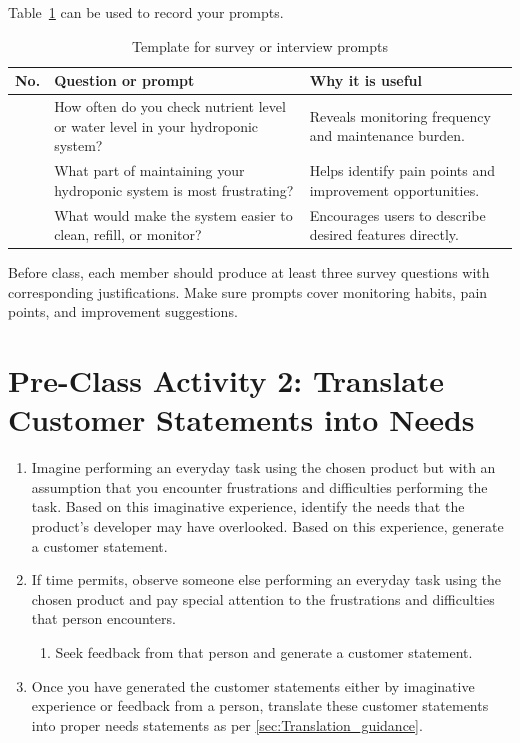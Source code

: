 Table~\ref{tab:session7-question-template} can be used to record your prompts.

\begin{table}[htbp]
\centering
\caption{Template for survey or interview prompts}
\label{tab:session7-question-template}
\renewcommand{\arraystretch}{1.2}
\begin{tabularx}{\textwidth}{|>{\raggedright\arraybackslash}p{}|>{\raggedright\arraybackslash}X|>{\raggedright\arraybackslash}p{}|}
\hline
\textbf{No.} & \textbf{Question or prompt} & \textbf{Why it is useful} \\
\hline
1 & How often do you check nutrient level or water level in your hydroponic system? & Reveals monitoring frequency and maintenance burden. \\
\hline
2 & What part of maintaining your hydroponic system is most frustrating? & Helps identify pain points and improvement opportunities. \\
\hline
3 & What would make the system easier to clean, refill, or monitor? & Encourages users to describe desired features directly. \\
\hline
\end{tabularx}
\end{table}

\begin{tcolorbox}[title=Checkpoint]
Before class, each member should produce at least three survey questions with corresponding justifications. Make sure prompts cover monitoring habits, pain points, and improvement suggestions.
\end{tcolorbox}

\section{Pre-Class Activity 2: Translate Customer Statements into Needs}

\begin{enumerate}
    \item Imagine performing an everyday task using the chosen product but with an assumption that you encounter frustrations and difficulties performing the task. Based on this imaginative experience, identify the needs that the product's developer may have overlooked. Based on this experience, generate a customer statement.
    \item If time permits, observe someone else performing an everyday task using the chosen product and pay special attention to the frustrations and difficulties that person encounters.
    \begin{enumerate}
        \item Seek feedback from that person and generate a customer statement.
    \end{enumerate}
    \item Once you have generated the customer statements either by imaginative experience or feedback from a person, translate these customer statements into proper needs statements as per \ref{sec:Translation_guidance}.
\end{enumerate}

